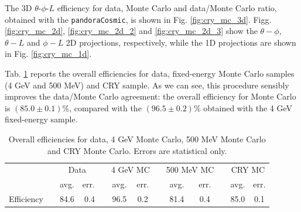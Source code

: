 \documentclass[a4paper]{scrartcl}
\renewcommand{\arraystretch}{1.2}
\newcommand{\ra}[1]{\renewcommand{\arraystretch}{#1}}
\begin{document}
The 3D $\theta$-$\phi$-$L$ efficiency for data, Monte Carlo and data/Monte Carlo ratio, obtained with the \texttt{pandoraCosmic}, is shown in Fig. \ref{fig:cry_mc_3d}.
Figg. \ref{fig:cry_mc_2d}, \ref{fig:cry_mc_2d_2} and \ref{fig:cry_mc_2d_3} show the $\theta-\phi$, $\theta-L$ and $\phi-L$ 2D projections, respectively, while the 1D projections are shown in Fig. \ref{fig:cry_mc_1d}.

Tab. \ref{tab:mc} reports the overall efficiencies for data, fixed-energy Monte Carlo samples (4 GeV and 500 MeV) and CRY sample. As we can see, this procedure sensibly improves the data/Monte Carlo agreement: the overall efficiency for Monte Carlo is $(85.0\pm0.1)\%$, compared with the $(96.5\pm0.2)\%$ obtained with the 4 GeV fixed-energy sample.

\begin{table}[htbp]
  \centering
  \ra{1.2}
  \begin{tabular}{lcrrrcccccccc}
    \toprule
    & \phantom{a}& \multicolumn{2}{c}{Data} & \phantom{a} & \multicolumn{2}{c}{4 GeV MC} & \phantom{a} & \multicolumn{2}{c}{500 MeV MC} & \phantom{a} & \multicolumn{2}{c}{CRY MC}\\
    \cmidrule{3-4} \cmidrule{6-7} \cmidrule{9-10} \cmidrule{12-13}
    & & avg. & err. & & avg. & err. & & avg. & err. & & avg. & err.\\
    \midrule
    Efficiency & & 84.6 & 0.4 & & 96.5 & 0.2 & & 81.4 & 0.4 & & 85.0 & 0.1\\
    \bottomrule
  \end{tabular}
  \caption{Overall efficiencies for data, 4 GeV Monte Carlo, 500 MeV Monte Carlo and CRY Monte Carlo. Errors are statistical only.}\label{tab:mc}
\end{table}
\end{document}
